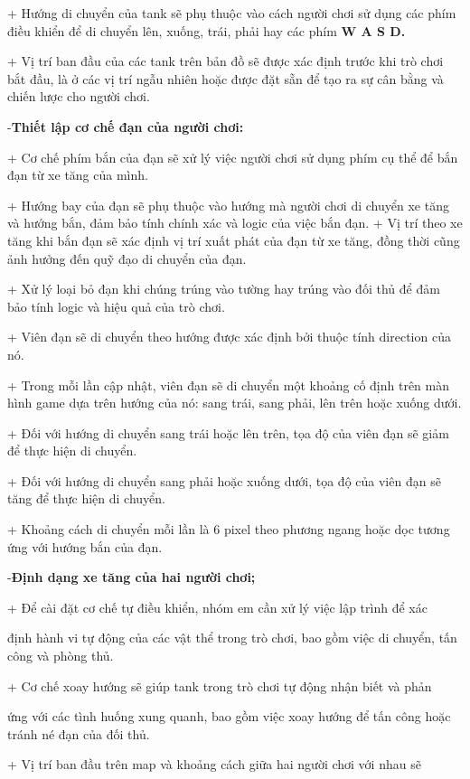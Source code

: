 \documentclass[a4paper]{article}
\begin{document}
+ Hướng di chuyển của tank sẽ phụ thuộc vào cách người chơi sử dụng các
phím điều khiển để di chuyển lên, xuống, trái, phải hay các phím
\textbf{W A S D.}

+ Vị trí ban đầu của các tank trên bản đồ sẽ được xác định trước khi trò
chơi bắt đầu, là ở các vị trí ngẫu nhiên hoặc được đặt sẵn để tạo ra sự
cân bằng và chiến lược cho người chơi.

-\textbf{Thiết lập cơ chế đạn của người chơi:}

+ Cơ chế phím bắn của đạn sẽ xử lý việc người chơi sử dụng phím cụ thể
để bắn đạn từ xe tăng của mình.

+ Hướng bay của đạn sẽ phụ thuộc vào hướng mà người chơi di chuyển xe
tăng và hướng bắn, đảm bảo tính chính xác và logic của việc bắn đạn. +
Vị trí theo xe tăng khi bắn đạn sẽ xác định vị trí xuất phát của đạn từ
xe tăng, đồng thời cũng ảnh hưởng đến quỹ đạo di chuyển của đạn.

+ Xử lý loại bỏ đạn khi chúng trúng vào tường hay trúng vào đối thủ để
đảm bảo tính logic và hiệu quả của trò chơi.

+ Viên đạn sẽ di chuyển theo hướng được xác định bởi thuộc tính
direction của nó.

+ Trong mỗi lần cập nhật, viên đạn sẽ di chuyển một khoảng cố định trên
màn hình game dựa trên hướng của nó: sang trái, sang phải, lên trên hoặc
xuống dưới.

+ Đối với hướng di chuyển sang trái hoặc lên trên, tọa độ của viên đạn
sẽ giảm để thực hiện di chuyển.

+ Đối với hướng di chuyển sang phải hoặc xuống dưới, tọa độ của viên đạn
sẽ tăng để thực hiện di chuyển.

+ Khoảng cách di chuyển mỗi lần là 6 pixel theo phương ngang hoặc dọc
tương ứng với hướng bắn của đạn.

-\textbf{Định dạng xe tăng của hai người chơi;}

+ Để cài đặt cơ chế tự điều khiển, nhóm em cần xử lý việc lập trình để
xác

định hành vi tự động của các vật thể trong trò chơi, bao gồm việc di
chuyển, tấn công và phòng thủ.

+ Cơ chế xoay hướng sẽ giúp tank trong trò chơi tự động nhận biết và
phản

ứng với các tình huống xung quanh, bao gồm việc xoay hướng để tấn công
hoặc tránh né đạn của đối thủ.

+ Vị trí ban đầu trên map và khoảng cách giữa hai người chơi với nhau sẽ
\end{document}
